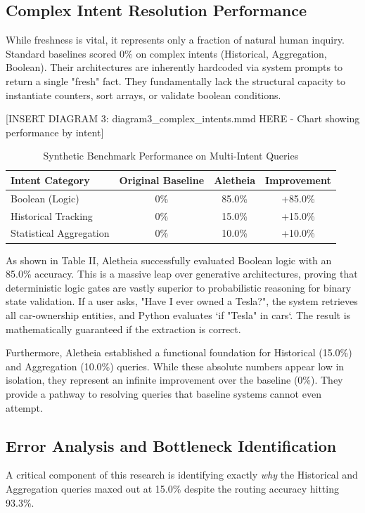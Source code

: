 \documentclass[journal,10pt]{IEEEtran}
\begin{document}
\subsection{Complex Intent Resolution Performance}
While freshness is vital, it represents only a fraction of natural human inquiry. Standard baselines scored 0\% on complex intents (Historical, Aggregation, Boolean). Their architectures are inherently hardcoded via system prompts to return a single "fresh" fact. They fundamentally lack the structural capacity to instantiate counters, sort arrays, or validate boolean conditions. 

[INSERT DIAGRAM 3: diagram3\_complex_intents.mmd HERE - Chart showing performance by intent]

\begin{table}[htbp]
\caption{Synthetic Benchmark Performance on Multi-Intent Queries}
\begin{center}
\begin{tabular}{|l|c|c|c|}
\hline
\textbf{Intent Category} & \textbf{Original Baseline} & \textbf{Aletheia} & \textbf{Improvement} \\
\hline
Boolean (Logic) & 0\% & 85.0\% & +85.0\% \\
Historical Tracking & 0\% & 15.0\% & +15.0\% \\
Statistical Aggregation & 0\% & 10.0\% & +10.0\% \\
\hline
\end{tabular}
\label{tab2}
\end{center}
\end{table}

As shown in Table II, Aletheia successfully evaluated Boolean logic with an 85.0\% accuracy. This is a massive leap over generative architectures, proving that deterministic logic gates are vastly superior to probabilistic reasoning for binary state validation. If a user asks, "Have I ever owned a Tesla?", the system retrieves all car-ownership entities, and Python evaluates `if "Tesla" in cars`. The result is mathematically guaranteed if the extraction is correct.

Furthermore, Aletheia established a functional foundation for Historical (15.0\%) and Aggregation (10.0\%) queries. While these absolute numbers appear low in isolation, they represent an infinite improvement over the baseline (0\%). They provide a pathway to resolving queries that baseline systems cannot even attempt.

\subsection{Error Analysis and Bottleneck Identification}
A critical component of this research is identifying exactly \textit{why} the Historical and Aggregation queries maxed out at 15.0\% despite the routing accuracy hitting 93.3\%. 
\end{document}

